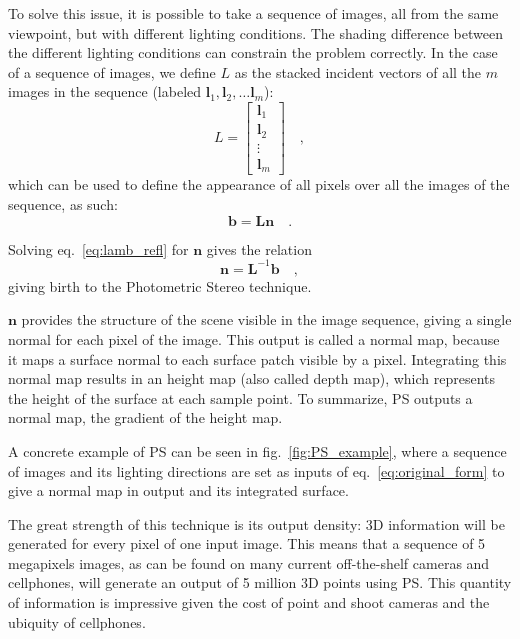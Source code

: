 \documentclass{report}
\begin{document}
To solve this issue, it is possible to take a sequence of images, all from the same viewpoint, but with different lighting conditions. The shading difference between the different lighting conditions can constrain the problem correctly. In the case of a sequence of images, we define $L$ as the stacked incident vectors of all the $m$ images in the sequence (labeled $\mathbf{l}_{1}, \mathbf{l}_{2}, \dots \mathbf{l}_{m}$):
\begin{equation}
L =
\begin{bmatrix}
    \mathbf{l}_{1} \\
    \mathbf{l}_{2} \\
    \vdots \\
    \mathbf{l}_{m}
\end{bmatrix}
\quad,
\end{equation}
which can be used to define the appearance of all pixels over all the images of the sequence, as such:
\begin{equation}
\label{eq:lamb_refl}
\mathbf{b} =  \mathbf{L} \mathbf{n} \quad.
\end{equation}

Solving eq.~\eqref{eq:lamb_refl} for $\mathbf{n}$ gives the relation
\begin{equation}
\label{eq:original_form}
\mathbf{n} =  \mathbf{L}^{-1} \mathbf{b} \quad,
\end{equation}
giving birth to the Photometric Stereo technique.

$\mathbf{n}$ provides the structure of the scene visible in the image sequence, giving a single normal for each pixel of the image. This output is called a normal map, because it maps a surface normal to each surface patch visible by a pixel. Integrating this normal map results in an height map (also called depth map), which represents the height of the surface at each sample point. To summarize, PS outputs a normal map, the gradient of the height map.

A concrete example of PS can be seen in fig.~\ref{fig:PS_example}, where a sequence of images and its lighting directions are set as inputs of eq.~\eqref{eq:original_form} to give a normal map in output and its integrated surface.

The great strength of this technique is its output density: 3D information will be generated for every pixel of one input image. This means that a sequence of 5 megapixels images, as can be found on many current off-the-shelf cameras and cellphones, will generate an output of 5 million 3D points using PS. This quantity of information is impressive given the cost of point and shoot cameras and the ubiquity of cellphones.
\end{document}

